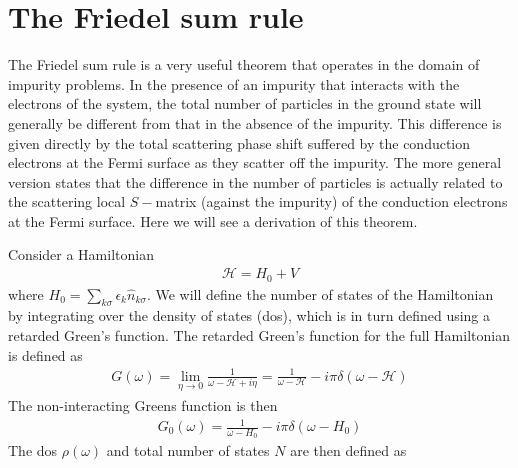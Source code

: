 \section{The Friedel sum rule}
The Friedel sum rule \cite{Friedel_1958,langer1961friedel,langreth1966} is a very useful theorem that operates in the domain of impurity problems. In the presence of an impurity that interacts with the electrons of the system, the total number of particles in the ground state will generally be different from that in the absence of the impurity. This difference is given directly by the total scattering phase shift suffered by the conduction electrons at the Fermi surface as they scatter off the impurity. The more general version states that the difference in the number of particles is actually related to the scattering local \(S-\)matrix (against the impurity) of the conduction electrons at the Fermi surface. Here we will see a derivation of this theorem.

Consider a Hamiltonian
\begin{equation}\begin{aligned}
	\mathcal{H} = H_0 + V
\end{aligned}\end{equation}
where \(H_0 = \sum_{k\sigma}\epsilon_k \hat n_{k\sigma}\). We will define the number of states of the Hamiltonian by integrating over the density of states (dos), which is in turn defined using a retarded Green's function. The retarded Green's function for the full Hamiltonian is defined as
\begin{equation}\begin{aligned}
	G(\omega) = \lim_{\eta \to 0}\frac{1}{\omega - \mathcal{H} + i\eta} = \frac{1}{\omega - \mathcal{H}} - i\pi\delta\left(\omega - \mathcal{H}\right)
\end{aligned}\end{equation}
The non-interacting Greens function is then
\begin{equation}\begin{aligned}
	G_0(\omega) = \frac{1}{\omega - H_0} - i\pi\delta\left(\omega - H_0\right)
\end{aligned}\end{equation}
The dos \(\rho(\omega)\) and total number of states \(N\) are then defined as

